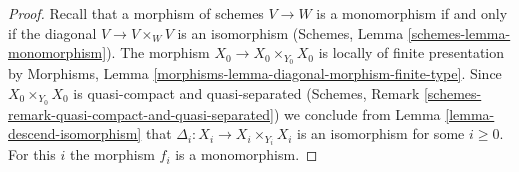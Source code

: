 \documentclass[10pt,a4paper]{amsart}
\theoremstyle{plain}
\theoremstyle{definition}
\theoremstyle{remark}
\numberwithin{equation}{subsection}
\begin{document}
\begin{proof}
Recall that a morphism of schemes $V \to W$ is a monomorphism if and
only if the diagonal $V \to V \times_W V$ is an isomorphism
(Schemes, Lemma \ref{schemes-lemma-monomorphism}).
The morphism $X_0 \to X_0 \times_{Y_0} X_0$ is locally of finite
presentation by
Morphisms, Lemma \ref{morphisms-lemma-diagonal-morphism-finite-type}.
Since $X_0 \times_{Y_0} X_0$ is quasi-compact and quasi-separated
(Schemes, Remark \ref{schemes-remark-quasi-compact-and-quasi-separated})
we conclude from
Lemma \ref{lemma-descend-isomorphism}
that $\Delta_i : X_i \to X_i \times_{Y_i} X_i$ is an isomorphism for
some $i \geq 0$. For this $i$ the morphism $f_i$ is a monomorphism.
\end{proof}
\end{document}
